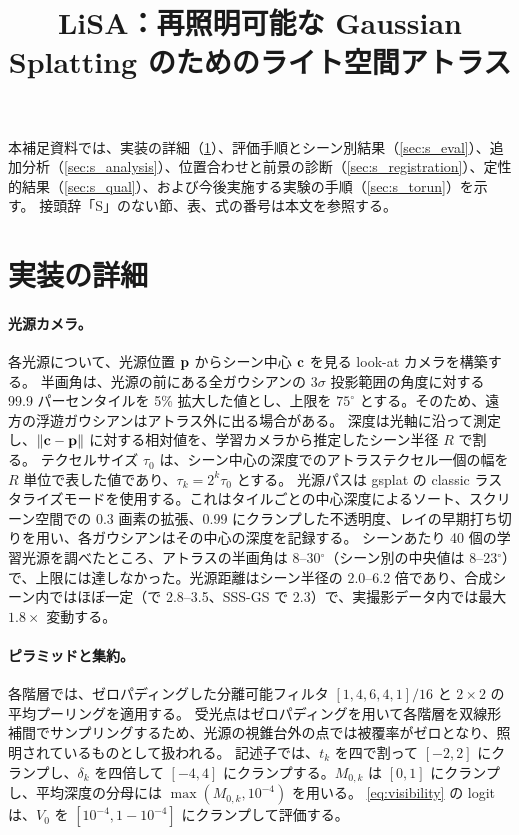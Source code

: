 \documentclass[10pt,twocolumn,letterpaper]{article}
\title{LiSA：再照明可能な Gaussian Splatting のためのライト空間アトラス}
\begin{document}
\maketitlesupplementary
\renewcommand{\thesection}{S\arabic{section}}
\renewcommand{\thetable}{S\arabic{table}}
\renewcommand{\thefigure}{S\arabic{figure}}
\renewcommand{\theequation}{S\arabic{equation}}

本補足資料では、実装の詳細（\cref{sec:s_impl}）、評価手順とシーン別結果（\cref{sec:s_eval}）、追加分析（\cref{sec:s_analysis}）、位置合わせと前景の診断（\cref{sec:s_registration}）、定性的結果（\cref{sec:s_qual}）、および今後実施する実験の手順（\cref{sec:s_torun}）を示す。
接頭辞「S」のない節、表、式の番号は本文を参照する。

\section{実装の詳細}
\label{sec:s_impl}

\paragraph{光源カメラ。}
各光源について、光源位置 $\mathbf{p}$ からシーン中心 $\mathbf{c}$ を見る look-at カメラを構築する。
半画角は、光源の前にある全ガウシアンの $3\sigma$ 投影範囲の角度に対する 99.9 パーセンタイルを 5\% 拡大した値とし、上限を $75^\circ$ とする。そのため、遠方の浮遊ガウシアンはアトラス外に出る場合がある。
深度は光軸に沿って測定し、$\|\mathbf{c}-\mathbf{p}\|$ に対する相対値を、学習カメラから推定したシーン半径 $R$ で割る。
テクセルサイズ $\tau_0$ は、シーン中心の深度でのアトラステクセル一個の幅を $R$ 単位で表した値であり、$\tau_k=2^k\tau_0$ とする。
光源パスは gsplat の classic ラスタライズモードを使用する。これはタイルごとの中心深度によるソート、スクリーン空間での 0.3 画素の拡張、0.99 にクランプした不透明度、レイの早期打ち切りを用い、各ガウシアンはその中心の深度を記録する。
シーンあたり 40 個の学習光源を調べたところ、アトラスの半画角は 8--30$^\circ$（シーン別の中央値は 8--23$^\circ$）で、上限には達しなかった。光源距離はシーン半径の 2.0--6.2 倍であり、合成シーン内ではほぼ一定（\gsthree で 2.8--3.5、SSS-GS で 2.3）で、実撮影データ内では最大 $1.8\times$ 変動する。

\paragraph{ピラミッドと集約。}
各階層では、ゼロパディングした分離可能フィルタ $[1,4,6,4,1]/16$ と $2\times2$ の平均プーリングを適用する。
受光点はゼロパディングを用いて各階層を双線形補間でサンプリングするため、光源の視錐台外の点では被覆率がゼロとなり、照明されているものとして扱われる。
記述子では、$t_k$ を四で割って $[-2,2]$ にクランプし、$\delta_k$ を四倍して $[-4,4]$ にクランプする。$M_{0,k}$ は $[0,1]$ にクランプし、平均深度の分母には $\max(M_{0,k},10^{-4})$ を用いる。
\cref{eq:visibility} の logit は、$V_0$ を $[10^{-4},1-10^{-4}]$ にクランプして評価する。
\end{document}
